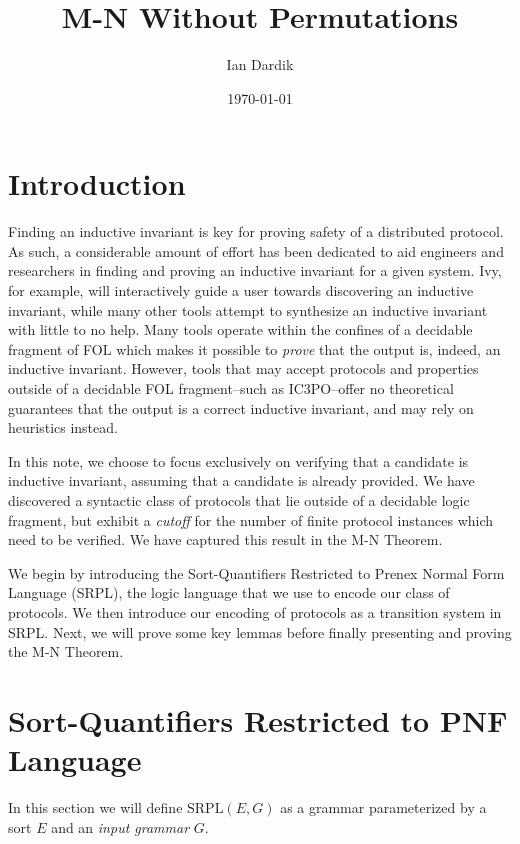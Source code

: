 \documentclass[12pt]{article}
\title{M-N Without Permutations}
\author{Ian Dardik}
\date{\today}
\theoremstyle{definition}
\theoremstyle{remark}
\newcommand{\SRPL}{\text{SRPL}}
\begin{document}
\maketitle

\section{Introduction}
Finding an inductive invariant is key for proving safety of a distributed protocol.  As such, a considerable amount of effort has been dedicated to aid engineers and researchers in finding and proving an inductive invariant for a given system.  Ivy, for example, will interactively guide a user towards discovering an inductive invariant, while many other tools attempt to synthesize an inductive invariant with little to no help.  Many tools operate within the confines of a decidable fragment of FOL which makes it possible to \textit{prove} that the output is, indeed, an inductive invariant.  However, tools that may accept protocols and properties outside of a decidable FOL fragment--such as IC3PO--offer no theoretical guarantees that the output is a correct inductive invariant, and may rely on heuristics instead.

In this note, we choose to focus exclusively on verifying that a candidate is inductive invariant, assuming that a candidate is already provided.  We have discovered a syntactic class of protocols that lie outside of a decidable logic fragment, but exhibit a \textit{cutoff} for the number of finite protocol instances which need to be verified.  We have captured this result in the M-N Theorem.

We begin by introducing the Sort-Quantifiers Restricted to Prenex Normal Form Language (SRPL), the logic language that we use to encode our class of protocols.  We then introduce our encoding of protocols as a transition system in SRPL.  Next, we will prove some key lemmas before finally presenting and proving the M-N Theorem.



\section{Sort-Quantifiers Restricted to PNF Language}

In this section we will define $\SRPL(E,G)$ as a grammar parameterized by a sort $E$ and an \textit{input grammar} $G$.
\end{document}
